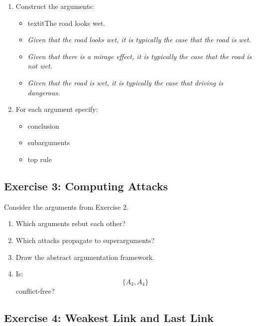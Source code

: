 \documentclass[11pt]{article}
\begin{document}
\begin{enumerate}
    \item Construct the arguments:
        \begin{itemize}

            \item textit{The road looks wet.}

            \item \textit{Given that the road looks wet, it is typically the case that the road is wet.}

            \item \textit{Given that there is a mirage effect, it is typically the case that the road is not wet.}

            \item \textit{Given that the road is wet, it is typically the case that driving is dangerous.}
        \end{itemize}

    \item For each argument specify:
    \begin{itemize}
        \item conclusion
        \item subarguments
        \item top rule
    \end{itemize}
\end{enumerate}

\subsection{Exercise 3: Computing Attacks}

Consider the arguments from Exercise 2.

\begin{enumerate}
    \item Which arguments rebut each other?

    \item Which attacks propagate to superarguments?

    \item Draw the abstract argumentation framework.

    \item Is:
    \[
    \{A_3,A_4\}
    \]
    conflict-free?
\end{enumerate}

\subsection{Exercise 4: Weakest Link and Last Link}
\end{document}

